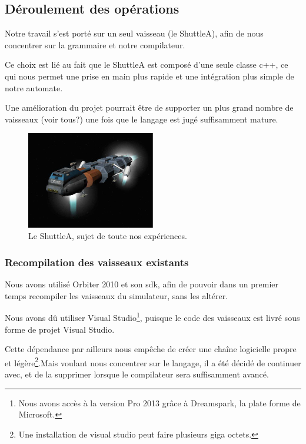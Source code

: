 \documentclass[a4paper,11pt]{article}
\begin{document}
    \subsection{Déroulement des opérations}
        Notre travail s'est porté sur un seul vaisseau (le ShuttleA), afin de nous concentrer sur la grammaire et notre compilateur. 
        
        Ce choix est lié au fait que le ShuttleA est composé d'une seule classe c++, ce qui nous permet une prise en main plus rapide et une intégration plus simple de notre automate. 
        
        Une amélioration du projet pourrait être de supporter un plus grand nombre de vaisseaux (voir tous?) une fois que le langage est jugé suffisamment mature.

        \begin{figure}[!h]
            \begin{center}
                \includegraphics[width=0.5\textwidth]{img/shuttleA.png}
                \caption{Le ShuttleA, sujet de toute nos expériences.}
            \end{center}
        \end{figure}


    \subsubsection{Recompilation des vaisseaux existants}
        Nous avons utilisé Orbiter 2010 et son sdk, afin de pouvoir dans un premier temps recompiler les vaisseaux du simulateur, sans les altérer.

        Nous avons dû utiliser Visual Studio\footnote{Nous avons accès à la version Pro 2013 grâce à Dreamspark, la plate forme de Microsoft.}, puisque le code des vaisseaux est livré sous forme de projet Visual Studio. 
        
        Cette dépendance par ailleurs nous empêche de créer une chaîne logicielle propre et légère\footnote{Une installation de visual studio peut faire plusieurs giga octets.}.Mais voulant nous concentrer sur le langage, il a été décidé de continuer avec, et de la supprimer lorsque le compilateur sera suffisamment avancé.
\end{document}
